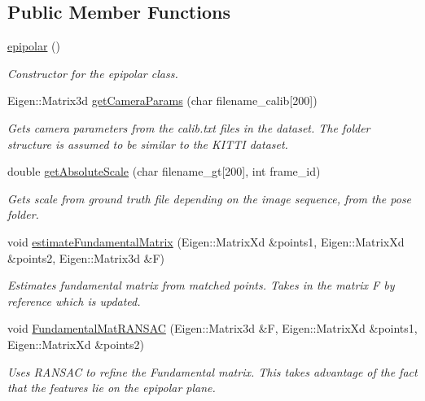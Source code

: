 \subsection*{Public Member Functions}
\begin{DoxyCompactItemize}
\item 
\hyperlink{classepipolar_af5946f7532025b261a04dac12e18946d}{epipolar} ()
\begin{DoxyCompactList}\small\item\em Constructor for the epipolar class. \end{DoxyCompactList}\item 
Eigen\+::\+Matrix3d \hyperlink{classepipolar_a704a496c08556dac8133ec1b403e728c}{get\+Camera\+Params} (char filename\+\_\+calib\mbox{[}200\mbox{]})
\begin{DoxyCompactList}\small\item\em Gets camera parameters from the calib.\+txt files in the dataset. The folder structure is assumed to be similar to the K\+I\+T\+TI dataset. \end{DoxyCompactList}\item 
double \hyperlink{classepipolar_a7afbdbd2643ef41ca10bd7ad053f3762}{get\+Absolute\+Scale} (char filename\+\_\+gt\mbox{[}200\mbox{]}, int frame\+\_\+id)
\begin{DoxyCompactList}\small\item\em Gets scale from ground truth file depending on the image sequence, from the pose folder. \end{DoxyCompactList}\item 
void \hyperlink{classepipolar_a7c50ca7a4431c5e08a848bed9dba878e}{estimate\+Fundamental\+Matrix} (Eigen\+::\+Matrix\+Xd \&points1, Eigen\+::\+Matrix\+Xd \&points2, Eigen\+::\+Matrix3d \&F)
\begin{DoxyCompactList}\small\item\em Estimates fundamental matrix from matched points. Takes in the matrix F by reference which is updated. \end{DoxyCompactList}\item 
void \hyperlink{classepipolar_a8530a3ec65e1915ee7df1c555c74014e}{Fundamental\+Mat\+R\+A\+N\+S\+AC} (Eigen\+::\+Matrix3d \&F, Eigen\+::\+Matrix\+Xd \&points1, Eigen\+::\+Matrix\+Xd \&points2)
\begin{DoxyCompactList}\small\item\em Uses R\+A\+N\+S\+AC to refine the Fundamental matrix. This takes advantage of the fact that the features lie on the epipolar plane. \end{DoxyCompactList}\item 

\end{DoxyCompactItemize}
